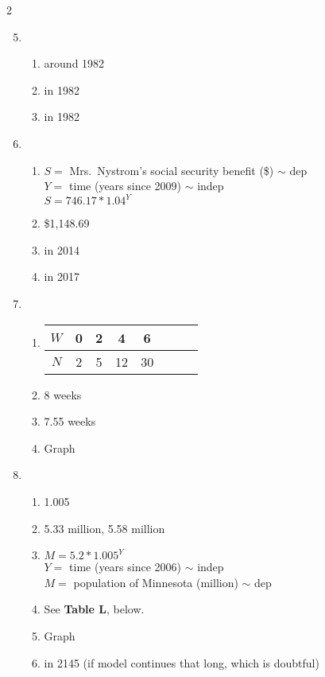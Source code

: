 \begin{multicols} {2}
\begin{enumerate}
\setcounter{enumi}{4}

\item %
\begin{enumerate}
\item around 1982
\item in 1982
\item in 1982
\end{enumerate}

\item %
\begin{enumerate}
\item $S =$ Mrs.\ Nystrom's social security benefit (\$) $\sim$ dep \\ $Y=$ time (years since 2009) $\sim$ indep \\ $S=746.17 \ast 1.04^Y$
\item \$1,148.69
\item in 2014
\item in 2017
\end{enumerate}

\item %
\begin{enumerate}
\item \begin{tabular} {|c| |c|c |c|c |c|c |c|}\hline
$W$ & 0 & 2 & 4 & 6\\ \hline
$N$ & 2 & 5 & 12 & 30  \\ \hline
\end{tabular}
\item 8 weeks
\item 7.55 weeks
\item Graph
\end{enumerate}

\item %
\begin{enumerate}
\item 1.005
\item 5.33 million, 5.58 million
\item $M=5.2 \ast 1.005^Y$ \\ $Y =$ time (years since 2006) $\sim$ indep \\ $M=$ population of Minnesota (million) $\sim$ dep
\item See \textbf{Table L}, below.
\item Graph
\item in 2145 (if model continues that long, which is doubtful)
\end{enumerate}


\end{enumerate}
\end{multicols}
